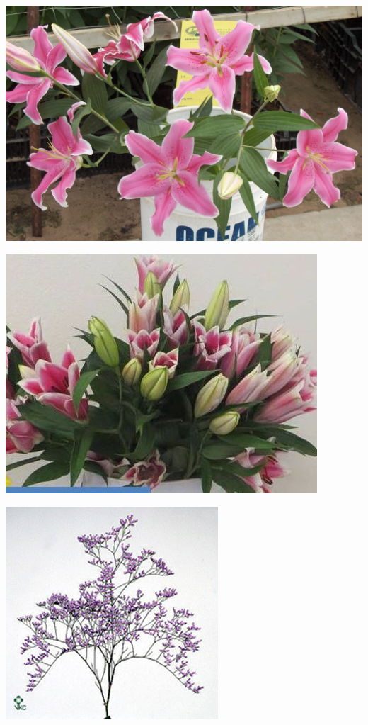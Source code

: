 \documentclass{article}
\begin{document}
\begin{center}
\includegraphics[height=0.925\paperheight]{../Lily_Oriental.jpg}
\end{center}
\newpage

\begin{center}
\includegraphics[height=0.925\paperheight]{../Lily_Oriental2.jpg}
\end{center}
\newpage

\begin{center}
\includegraphics[height=0.925\paperheight]{../Limonium_MistyBlue.jpg}
\end{center}
\newpage
\end{document}
